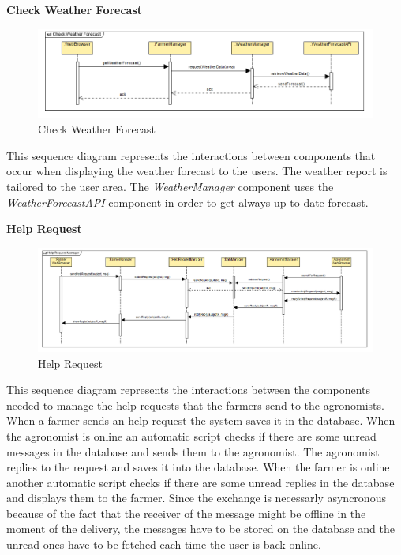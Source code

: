 \documentclass[table, 12pt]{article}
\begin{document}
\newpage
\textbf{Check Weather Forecast}
\begin{center}
    \begin{figure}[H]
        \includegraphics[scale=0.6, center]{assets/SequenceDiagram/CheckWeatherForecast.png}
        \caption{Check Weather Forecast}
        \label{fig: forecast}
    \end{figure}
\end{center}
This sequence diagram represents the interactions between components that occur when displaying the weather forecast to the users. The weather report is tailored to the user area.
The \textit{WeatherManager} component uses the \textit{WeatherForecastAPI} component in order to get always up-to-date forecast.

\newpage
\textbf{Help Request}
\begin{center}
    \begin{figure}[H]
        \includegraphics[scale=0.5, center]{assets/SequenceDiagram/HelpRequestManager.png}
        \caption{Help Request}
        \label{fig: helpRequest}
    \end{figure}
\end{center}
This sequence diagram represents the interactions between the components needed to manage the help requests that the farmers send to the agronomists.
When a farmer sends an help request the system saves it in the database.
When the agronomist is online an automatic script checks if there are some unread messages in the database and sends them to the agronomist.
The agronomist replies to the request and saves it into the database. 
When the farmer is online another automatic script checks if there are some unread replies in the database and displays them to the farmer.
Since the exchange is necessarly asyncronous because of the fact that the receiver of the message might be offline in the moment of the delivery, the messages have to be stored on the database and the unread ones have to be fetched each time the user is back online.   
\end{document}
